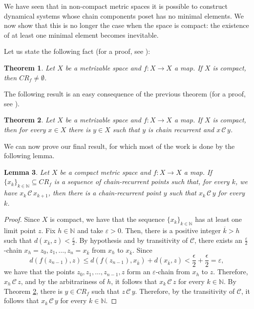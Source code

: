 \documentclass[pdflatex,sn-mathphys-num]{sn-jnl}
\theoremstyle{thmstyleone}%
\newtheorem{thm}{Theorem}
\newtheorem{lem}[thm]{Lemma}
\theoremstyle{thmstyletwo}%
\theoremstyle{thmstylethree}%
\begin{document}
\noindent We have seen that in non-compact metric spaces it is possible to construct dynamical systems whose chain components poset has no minimal elements.
We now show that this is no longer the case when the space is compact: the existence of at least one minimal element becomes inevitable.

\noindent Let us state the following fact (for a proof, see \cite[Theorem 3.1]{chainsregularity}):
\begin{thm}
\label{thm1}
Let $X$ be a metrizable space and $f:X\to X$ a map. If $X$ is compact, then $CR_f\ne\emptyset$.
\end{thm}

\noindent The following result is an easy consequence of the previous theorem (for a proof, see \cite[Theorem 3.4]{chainsregularity}).
\begin{thm}
\label{cor1}
Let $X$ be a metrizable space and $f:X\to X$ a map. If $X$ is compact, then for every $x\in X$ there is $y\in X$ such that $y$ is chain recurrent and $x\,\mathcal{C}\, y$.
\end{thm}
\noindent We can now prove our final result, for which most of the work is done by the following lemma.
\begin{lem}\label{lem_max}
Let $X$ be a compact metric space and $f:X\rightarrow X$ a map. If $\{x_k\}_{k\in\mathbb{N}}\subseteq CR_f$ is a sequence of chain-recurrent points such that, for every $k$, we have $x_k\,\mathcal{C}\, x_{k+1}$, then there is a chain-recurrent point $y$ such that $x_k\,\mathcal{C}\,y$ for every $k$.
\end{lem}
\begin{proof}
Since $X$ is compact, we have that the sequence $\{x_k\}_{k\in\mathbb{N}}$ has at least one limit point $z$. 
Fix $h \in\mathbb{N}$ and take $\varepsilon>0$. 
Then, there is a positive integer $\overline{k}>h$ such that $d(x_{\overline{k}},z)<\frac{\varepsilon}{2}$. 
By hypothesis and by transitivity of $\mathcal{C}$, there exists an $\frac{\varepsilon}{2}$-chain $x_h=z_0, z_1,\ldots, z_n=x_{\overline{k}}$ from $x_h$ to $x_{\overline{k}}$. 
Since
$$
d(f(z_{n-1}),z)\le d(f(z_{n-1}),x_{\overline{k}})+d(x_{\overline{k}},z)<\frac \epsilon 2 +\frac \epsilon 2=\varepsilon,
$$
we have that the points $z_0,z_1,\ldots,z_{n-1},z$ form an $\varepsilon$-chain from $x_h$ to $z$. 
Therefore, $x_h \,\mathcal{C}\, z$, and by the arbitrariness of $h$, it follows that $x_k\,\mathcal{C}\, z$ for every $k\in\mathbb{N}$.
By Theorem \ref{cor1}, there is $y\in CR_f$ such that $z\,\mathcal{C}\,y$. Therefore, by the transitivity of $\mathcal{C}$, it follows that $x_k\,\mathcal{C}\, y$ for every $k\in\mathbb{N}$.
\end{proof}
\end{document}
